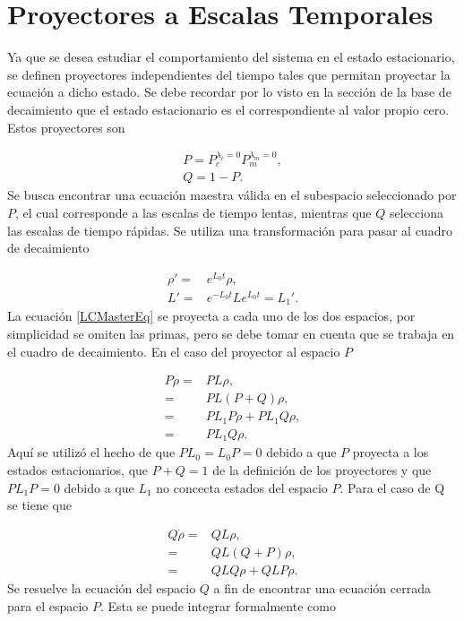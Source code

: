 \documentclass[a4paper,10pt]{report}
\begin{document}
\section{Proyectores a Escalas Temporales}

Ya que se desea estudiar el comportamiento del sistema en el estado estacionario, se definen proyectores independientes del tiempo tales que permitan proyectar la ecuación a dicho estado. Se debe recordar por lo visto en la sección de la base de decaimiento que el estado estacionario es el correspondiente al valor propio cero. Estos proyectores son

\begin{align}
P = P_c^{\lambda_c = 0}P_m^{\lambda_m = 0},\\
Q = 1 - P.
\end{align} Se busca encontrar una ecuación maestra válida en el subespacio seleccionado por $P$, el cual corresponde a las escalas de tiempo lentas, mientras que $Q$ selecciona las escalas de tiempo rápidas. Se utiliza una transformación para pasar al cuadro de decaimiento

\begin{align*}
 \rho' =& e^{L_0t}\rho,\\
 L' =& e^{-L_0t}Le^{L_0t} = L_1'.
\end{align*} La ecuación \eqref{LCMasterEq} se proyecta a cada uno de los dos espacios, por simplicidad se omiten las primas, pero se debe tomar en cuenta que se trabaja en el cuadro de decaimiento. En el caso del proyector al espacio $P$

\begin{align*}
P\dot{\rho} =& PL\rho,\\
=& PL(P+Q)\rho,\\
=& PL_1P\rho + PL_1Q\rho,\\
=& PL_1Q\rho.
\end{align*} Aquí se utilizó el hecho de que $PL_0 = L_0P = 0$ debido a que $P$ proyecta a los estados estacionarios,  que $P+Q=1$ de la definición de los proyectores y que $PL_1P=0$ debido a que $L_1$ no concecta estados del espacio $P$. Para el caso de Q se tiene que

\begin{align*}
Q\dot{\rho} =& QL\rho,\\
=& QL(Q+P)\rho,\\
=& QLQ\rho + QLP\rho.
\end{align*} Se resuelve la ecuación del espacio $Q$ a fin de encontrar una ecuación cerrada para el espacio $P$. Esta se puede integrar formalmente como
\end{document}
